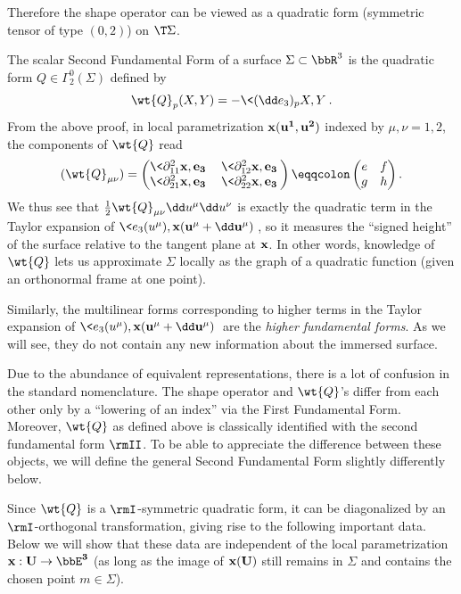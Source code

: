 Therefore the shape operator can be viewed as a quadratic form (symmetric tensor of type $(0,2)$) on $\T\Sigma$.

\begin{defn}
    The scalar Second Fundamental Form of a surface $\Sigma\subset\bbR^3$ is the quadratic form $Q\in\Gamma^0_2(\Sigma)$ defined by 
    \[\wt{Q}_p(X,Y)=-\<(\dd e_3)_{p}X,Y\>.\]
    From the above proof, in local parametrization $\bf{x}(u^1,u^2)$ indexed by $\mu,\nu=1,2$, the components of $\wt{Q}$ read 
    \[(\wt{Q}_{\mu\nu})=
    \begin{pmatrix}
        \<\partial^2_{11}\bf{x},e_3\>& \<\partial^2_{12}\bf{x},e_3\>\\
        \<\partial^2_{21}\bf{x},e_3\> & \<\partial^2_{22}\bf{x},e_3\>
    \end{pmatrix}
    \eqqcolon\begin{pmatrix}
        e&f\\
        g&h
    \end{pmatrix}.\label{eq hopf differential components}
    \]
    We thus see that $\frac12\wt{Q}_{\mu\nu}\dd u^\mu \dd u^\nu$ is exactly the quadratic term in the Taylor expansion of $\<e_3(u^\mu),\bf{x}(u^\mu+\dd u^\mu)\>$, so it measures the ``signed height'' of the surface relative to the tangent plane at $\bf{x}$. In other words, knowledge of $\wt{Q}$ lets us approximate $\Sigma$ locally as the graph of a quadratic function (given an orthonormal frame at one point).
\end{defn}

Similarly, the multilinear forms corresponding to higher terms in the Taylor expansion of $\<e_3(u^\mu),\bf{x}(u^\mu+\dd u^\mu)\>$ are the \emph{higher fundamental forms}. As we will see, they do not contain any new information about the immersed surface.


\begin{rem}
    Due to the abundance of equivalent representations, there is a lot of confusion in the standard nomenclature. The shape operator and $\wt{Q}$'s differ from each other only by a ``lowering of an index'' via the First Fundamental Form. Moreover, $\wt{Q}$ as defined above is classically identified with the second fundamental form $\rmII$. To be able to appreciate the difference between these objects, we will define the general Second Fundamental Form slightly differently below.
\end{rem}

Since $\wt{Q}$ is a $\rmI$-symmetric quadratic form, it can be diagonalized by an $\rmI$-orthogonal transformation, giving rise to the following important data. Below we will show that these data are independent of the local parametrization $\bf{x}:U\to \bbE^3$ (as long as the image of $\bf{x}(U)$ still remains in $\Sigma$ and contains the chosen point $m\in\Sigma$).

